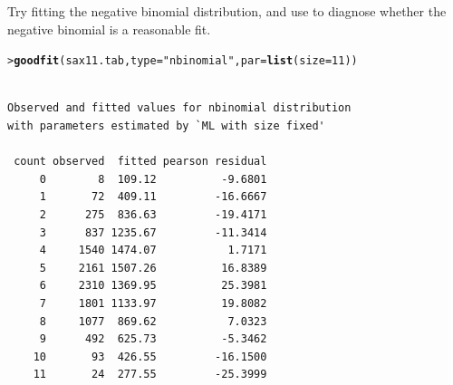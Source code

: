 \documentclass[10pt]{report}\usepackage[]{graphicx}\usepackage[]{color}
\makeatletter
\newcommand{\hlnum}[1]{\textcolor[rgb]{0.686,0.059,0.569}{#1}}%
\newcommand{\hlstr}[1]{\textcolor[rgb]{0.192,0.494,0.8}{#1}}%
\newcommand{\hlstd}[1]{\textcolor[rgb]{0.345,0.345,0.345}{#1}}%
\newcommand{\hlkwc}[1]{\textcolor[rgb]{0.333,0.667,0.333}{#1}}%
\newcommand{\hlkwd}[1]{\textcolor[rgb]{0.737,0.353,0.396}{\textbf{#1}}}%
\newenvironment{kframe}{%
 \def\at@end@of@kframe{}%
 \ifinner\ifhmode%
  \def\at@end@of@kframe{\end{minipage}}%
  \begin{minipage}{\columnwidth}%
 \fi\fi%
 \def\FrameCommand##1{\hskip\@totalleftmargin \hskip-\fboxsep
 \colorbox{shadecolor}{##1}\hskip-\fboxsep
     \hskip-\linewidth \hskip-\@totalleftmargin \hskip\columnwidth}%
 \MakeFramed {\advance\hsize-\width
   \@totalleftmargin\z@ \linewidth\hsize
   \@setminipage}}%
 {\par\unskip\endMakeFramed%
 \at@end@of@kframe}
\newenvironment{knitrout}{}{} %
\renewenvironment{knitrout}{\small\renewcommand{\baselinestretch}{.85}}{} %
\makeatother
\begin{document}
\begin{Exercises}
\begin{enumerate*}
    \item Try fitting the negative binomial distribution, and use  to diagnose
    whether the negative binomial is a reasonable fit. 
    \begin{ans}
\begin{knitrout}\footnotesize
{}\color{fgcolor}\begin{kframe}
\begin{alltt}
\hlstd{> }\hlkwd{goodfit}\hlstd{(sax11.tab,} \hlkwc{type}\hlstd{=}\hlstr{"nbinomial"}\hlstd{,} \hlkwc{par}\hlstd{=}\hlkwd{list}\hlstd{(}\hlkwc{size}\hlstd{=}\hlnum{11}\hlstd{))}
\end{alltt}
\begin{verbatim}

Observed and fitted values for nbinomial distribution
with parameters estimated by `ML with size fixed' 

 count observed  fitted pearson residual
     0        8  109.12          -9.6801
     1       72  409.11         -16.6667
     2      275  836.63         -19.4171
     3      837 1235.67         -11.3414
     4     1540 1474.07           1.7171
     5     2161 1507.26          16.8389
     6     2310 1369.95          25.3981
     7     1801 1133.97          19.8082
     8     1077  869.62           7.0323
     9      492  625.73          -5.3462
    10       93  426.55         -16.1500
    11       24  277.55         -25.3999
\end{verbatim}
\end{kframe}
\end{knitrout}
    \end{ans}
    
  \end{enumerate*}


\end{Exercises}
\end{document}
